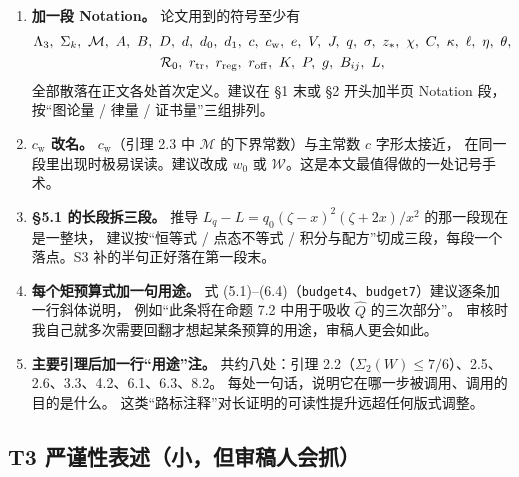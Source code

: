 \documentclass[UTF8,11pt]{ctexart}
\newcommand{\Lam}{\Lambda}
\newcommand{\M}{\mathcal{M}}
\newcommand{\cstar}{c_{\mathrm{w}}}
\newcommand{\file}[1]{\texttt{#1}}
\begin{document}
\begin{enumerate}[leftmargin=2em,itemsep=4pt]
\item \textbf{加一段 Notation。}
论文用到的符号至少有
\[\begin{gathered}
 \Lam_3,\ \Sigma_k,\ \M,\ A,\ B,\ D,\ d,\ d_0,\ d_1,\ c,\ \cstar,\ e,\ V,\ J,\ q,\ \sigma,\ z_*,\ \chi,\ C,\ \kappa,\ \ell,\ \eta,\ \theta,\\
 \mathcal R_0,\ r_{\rm tr},\ r_{\rm reg},\ r_{\rm off},\ K,\ P,\ g,\ B_{ij},\ L ,
\end{gathered}\]
全部散落在正文各处首次定义。建议在 \S1 末或 \S2 开头加半页 Notation 段，按``图论量 / 律量 / 证书量''三组排列。

\item \textbf{$\cstar$ 改名。}
$c_{\mathrm w}$（引理 2.3 中 $\mathcal M$ 的下界常数）与主常数 $c$ 字形太接近，
在同一段里出现时极易误读。建议改成 $w_0$ 或 $\mathcal W$。这是本文最值得做的一处记号手术。

\item \textbf{\S5.1 的长段拆三段。}
推导 $L_q-L=q_0(\zeta-x)^2(\zeta+2x)/x^2$ 的那一段现在是一整块，
建议按``恒等式 / 点态不等式 / 积分与配方''切成三段，每段一个落点。S3 补的半句正好落在第一段末。

\item \textbf{每个矩预算式加一句用途。}
式 (5.1)--(6.4)（\file{budget4}、\file{budget7}）建议逐条加一行斜体说明，
例如``此条将在命题 7.2 中用于吸收 $\widehat Q$ 的三次部分''。
审核时我自己就多次需要回翻才想起某条预算的用途，审稿人更会如此。

\item \textbf{主要引理后加一行``用途''注。}
共约八处：引理 2.2（$\Sigma_2(W)\le7/6$）、2.5、2.6、3.3、4.2、6.1、6.3、8.2。
每处一句话，说明它在哪一步被调用、调用的目的是什么。
这类``路标注释''对长证明的可读性提升远超任何版式调整。
\end{enumerate}

\subsection{T3 严谨性表述（小，但审稿人会抓）}
\end{document}
